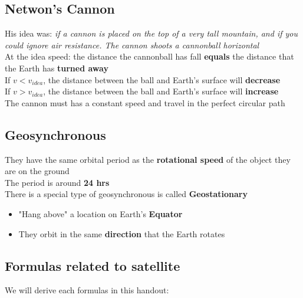 \subsection{Netwon's Cannon}
His idea was: \textit{if a cannon is placed on the top of a very tall mountain, and if you could ignore air resistance. The cannon 
shoots a cannonball horizontal}\\

At the idea speed: the distance the cannonball has fall \textbf{equals} the distance that the Earth has \textbf{turned away}\\

If $v  < v_{idea}$, the distance between the ball and Earth's surface will \textbf{decrease}\\

If $v  > v_{idea}$, the distance between the ball and Earth's surface will \textbf{increase}\\

The cannon must has a constant speed and travel in the perfect circular path

\subsection{Geosynchronous}
They have the same orbital period as the \textbf{rotational speed} of the object they are on the ground\\

The period is around \textbf{24 hrs}\\

There is a special type of geosynchronous is called \textbf{Geostationary}
\begin{itemize}
    \item "Hang above" a location on Earth's \textbf{Equator}
    \item They orbit in the same \textbf{direction} that the Earth rotates
\end{itemize}

\subsection{Formulas related to satellite}
We will derive each formulas in this handout:\\

